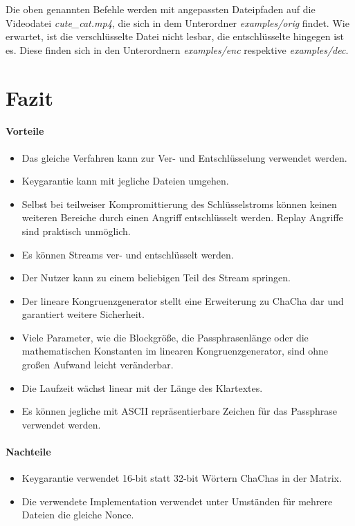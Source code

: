 \documentclass[10pt,a4paper]{article}
\begin{document}
Die oben genannten Befehle werden mit angepassten Dateipfaden auf die Videodatei \textit{cute\_cat.mp4}, die sich in dem Unterordner \textit{examples/orig} findet.
Wie erwartet, ist die verschlüsselte Datei nicht lesbar, die entschlüsselte hingegen ist es.
Diese finden sich in den Unterordnern \textit{examples/enc} respektive \textit{examples/dec}.

\section{Fazit}

\paragraph{Vorteile}
\begin{itemize}
    \item Das gleiche Verfahren kann zur Ver- und Entschlüsselung verwendet werden.
    \item Keygarantie kann mit jegliche Dateien umgehen.
    \item Selbst bei teilweiser Kompromittierung des Schlüsselstroms können keinen weiteren Bereiche durch einen Angriff entschlüsselt werden.
          Replay Angriffe sind praktisch unmöglich.
    \item Es können Streams ver- und entschlüsselt werden.
    \item Der Nutzer kann zu einem beliebigen Teil des Stream springen.
    \item Der lineare Kongruenzgenerator stellt eine Erweiterung zu ChaCha dar und garantiert weitere Sicherheit.
    \item Viele Parameter, wie die Blockgröße, die Passphrasenlänge oder die mathematischen Konstanten im linearen Kongruenzgenerator, sind ohne großen Aufwand leicht veränderbar.
    \item Die Laufzeit wächst linear mit der Länge des Klartextes.
    \item Es können jegliche mit ASCII repräsentierbare Zeichen für das Passphrase verwendet werden.
\end{itemize}

\paragraph{Nachteile}
\begin{itemize}
    \item Keygarantie verwendet 16-bit statt 32-bit Wörtern ChaChas in der Matrix.
    \item Die verwendete Implementation verwendet unter Umständen für mehrere Dateien die gleiche Nonce.
\end{itemize}
\end{document}
